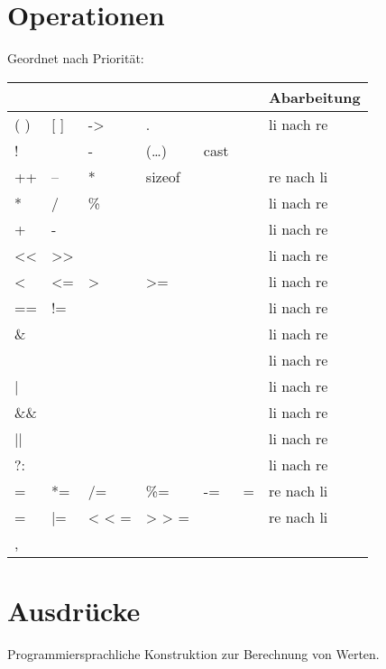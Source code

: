 \section{Operationen}
Geordnet nach Priorität:\\
\begin{tabular}{l l l l l l | l}
&&&&&&Abarbeitung\\
\hline
( )&[ ]&->&.&&&li nach re\\
!&~&-&(…)& cast&&\\
++&--&*&sizeof&&&re nach li\\
*&/&\%&&&&li nach re\\
+&-&&&&&li nach re\\
<<&>>&&&&&li nach re\\
<&<=&>&>=&&&li nach re\\
==&!=&&&&&li nach re\\
\& &&&&&&li nach re\\
$\hat{}$&&&&&&li nach re\\
|&&&&&&li nach re\\
\&\& &&&&&&li nach re\\
||&&&&&&li nach re\\
?: &&&&&&li nach re\\
=&*=&/=&\%=&-=&=&re nach li\\
$\hat{}$=&|=& < < = & > > = &&& re nach li\\
,&&&&&&\\
\end{tabular}


\section{Ausdrücke}
Programmiersprachliche Konstruktion zur Berechnung von Werten.
